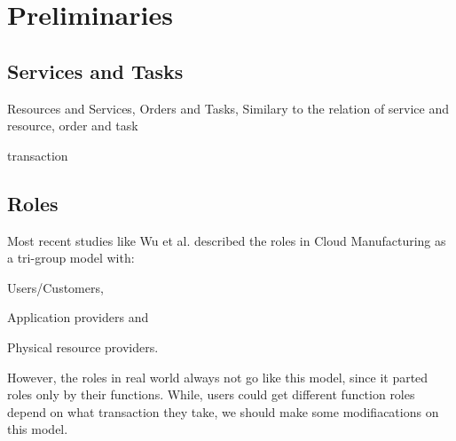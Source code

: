 \section{Preliminaries} %
\subsection{Services and Tasks}
Resources and Services, Orders and Tasks,
Similary to the relation of service and resource, order and task 

transaction

\subsection{Roles}
Most recent studies like Wu et al.\cite{Wu2013} described the roles in Cloud Manufacturing as a tri-group model with:\begin{inparaenum}[1)]
\item Users/Customers,
\item Application providers and
\item Physical resource providers.
\end{inparaenum}
However, the roles in real world always not go like this model, since it parted roles only by their functions. While, users could get different function roles depend on what transaction they take, we should make some modifiacations on this model.

